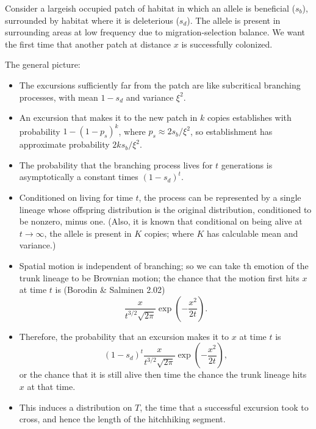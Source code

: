\documentclass{article}
\begin{document}
Consider a largeish occupied patch of habitat in which an allele is beneficial ($s_b$),
surrounded by habitat where it is deleterious ($s_d$).
The allele is present in surrounding areas at low frequency due to migration-selection balance.
We want the first time that another patch at distance $x$ is successfully colonized.

The general picture:
\begin{itemize}

\item The excursions sufficiently far from the patch are like subcritical branching processes,
with mean $1-s_d$ and variance $\xi^2$.

\item An excursion that makes it to the new patch in $k$ copies establishes with probability $1-(1-p_s)^k$,
where $p_s \approx 2s_b/\xi^2$, so establishment has approximate probability $2 k s_b / \xi^2$.

\item The probability that the branching process lives for $t$ generations is asymptotically a constant times $(1-s_d)^t$.

\item Conditioned on living for time $t$, the process can be represented by a single lineage whose offspring distribution
is the original distribution, conditioned to be nonzero, minus one.
(Also, it is known that conditional on being alive at $t\to\infty$, the allele is present in $K$ copies; where $K$ has calculable mean and variance.)

\item Spatial motion is independent of branching;
so we can take th emotion of the trunk lineage to be Brownian motion;
the chance that the motion first hits $x$ at time $t$ is (Borodin \& Salminen 2.02)
\[
\frac{x}{t^{3/2}\sqrt{2\pi}} \exp\left(-\frac{x^2}{2t}\right) .
\]

\item Therefore, the probability that an excursion makes it to $x$ at time $t$ is
\[
  (1-s_d)^t \frac{x}{t^{3/2}\sqrt{2\pi}} \exp\left(-\frac{x^2}{2t}\right) ,
\]
or the chance that it is still alive then time the chance the trunk lineage hits $x$ at that time.

\item This induces a distribution on $T$, the time that a successful excursion took to cross,
and hence the length of the hitchhiking segment.

\end{itemize}
\end{document}

